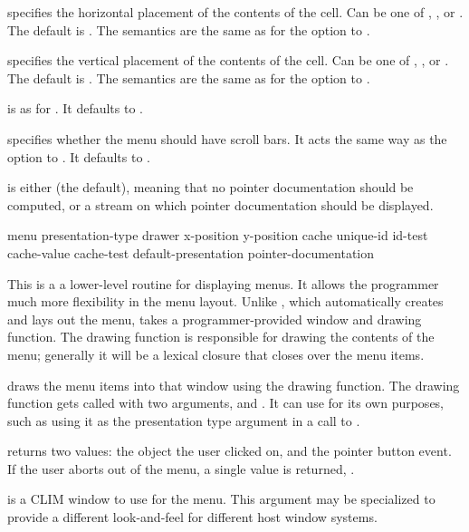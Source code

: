  specifies the horizontal placement of the contents of the
cell.  Can be one of , , or .  The default is
.   The semantics are the same as for the  option to
.

 specifies the vertical placement of the contents of the cell.
Can be one of , , or .  The default is
.  The semantics are the same as for the  option to
.

 is as for .  It defaults to .

 specifies whether the menu should have scroll bars.  It acts
the same way as the  option to .  It
defaults to .

 is either  (the default), meaning that no
pointer documentation should be computed, or a stream on which pointer
documentation should be displayed.


 {menu presentation-type drawer
                                       \key x-position y-position
                                            cache unique-id id-test cache-value cache-test
                                            default-presentation pointer-documentation}

This is a a lower-level routine for displaying menus.  It allows the programmer
much more flexibility in the menu layout.  Unlike , which
automatically creates and lays out the menu,  takes
a programmer-provided window and drawing function.  The drawing function is
responsible for drawing the contents of the menu; generally it will be a lexical
closure that closes over the menu items.

 draws the menu items into that window using the
drawing function.  The drawing function gets called with two arguments,
 and .  It can use 
for its own purposes, such as using it as the presentation type argument in a
call to .

 returns two values: the object the user clicked on,
and the pointer button event.  If the user aborts out of the menu, a single
value is returned, .

 is a CLIM window to use for the menu.  This argument may be
specialized to provide a different look-and-feel for different host window
systems.

